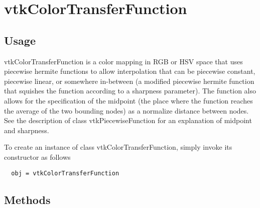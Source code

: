 \section{vtkColorTransferFunction}

\subsection{Usage}

 vtkColorTransferFunction is a color mapping in RGB or HSV space that
 uses piecewise hermite functions to allow interpolation that can be
 piecewise constant, piecewise linear, or somewhere in-between 
 (a modified piecewise hermite function that squishes the function
 according to a sharpness parameter). The function also allows for
 the specification of the midpoint (the place where the function
 reaches the average of the two bounding nodes) as a normalize distance
 between nodes.
 See the description of class vtkPiecewiseFunction for an explanation of
 midpoint and sharpness.

To create an instance of class vtkColorTransferFunction, simply
invoke its constructor as follows
\begin{verbatim}
  obj = vtkColorTransferFunction
\end{verbatim}
\subsection{Methods}

